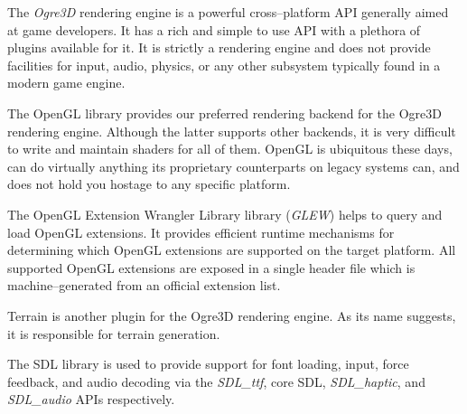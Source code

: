 
The {\it Ogre3D} rendering engine is a powerful cross--platform API generally aimed at game developers. It has a rich and simple to use API with a plethora of plugins available for it. It is strictly a rendering engine and does not provide facilities for input, audio, physics, or any other subsystem typically found in a modern game engine.


The OpenGL library provides our preferred rendering backend for the Ogre3D rendering engine. Although the latter supports other backends, it is very difficult to write and maintain shaders for all of them. OpenGL is ubiquitous these days, can do virtually anything its proprietary counterparts on legacy systems can, and does not hold you hostage to any specific platform.


The OpenGL Extension Wrangler Library library ({\it GLEW}) helps to query and load OpenGL extensions. It provides efficient runtime mechanisms for determining which OpenGL extensions are supported on the target platform. All supported OpenGL extensions are exposed in a single header file which is machine--generated from an official extension list.


Terrain is another plugin for the Ogre3D rendering engine. As its name suggests, it is responsible for terrain generation.


The SDL library is used to provide support for font loading, input, force feedback, and audio decoding via the {\it SDL_ttf}, core SDL, {\it SDL_haptic}, and {\it SDL_audio} APIs respectively.

\stopitemize

